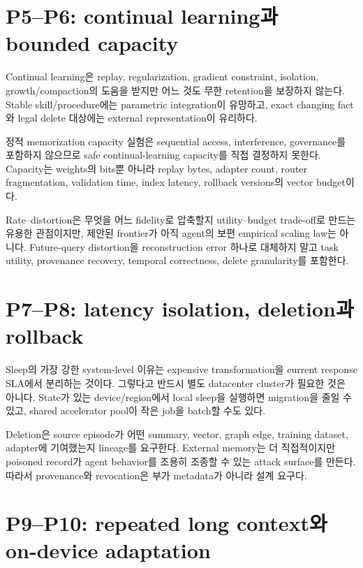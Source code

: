 \section{P5–P6: continual learning과 bounded capacity}

Continual learning은 replay, regularization, gradient constraint, isolation, growth/compaction의 도움을
받지만 어느 것도 무한 retention을 보장하지 않는다. Stable skill/procedure에는 parametric integration이
유망하고, exact changing fact와 legal delete 대상에는 external representation이 유리하다.

정적 memorization capacity 실험은 sequential access, interference, governance를 포함하지 않으므로
safe continual-learning capacity를 직접 결정하지 못한다. \parencite{srcstc0034,srcstc0036}
Capacity는 weights의 bits뿐 아니라 replay bytes, adapter count, router fragmentation, validation time,
index latency, rollback versions의 vector budget이다.

Rate--distortion은 무엇을 어느 fidelity로 압축할지 utility--budget trade-off로 만드는 유용한 관점이지만,
제안된 frontier가 아직 agent의 보편 empirical scaling law는 아니다.
\parencite{srcstc0035} Future-query distortion을 reconstruction error 하나로 대체하지 말고 task utility,
provenance recovery, temporal correctness, delete granularity를 포함한다.

\section{P7–P8: latency isolation, deletion과 rollback}

Sleep의 가장 강한 system-level 이유는 expensive transformation을 current response SLA에서 분리하는
것이다. 그렇다고 반드시 별도 datacenter cluster가 필요한 것은 아니다. State가 있는 device/region에서
local sleep을 실행하면 migration을 줄일 수 있고, shared accelerator pool이 작은 job을 batch할 수도 있다.

Deletion은 source episode가 어떤 summary, vector, graph edge, training dataset, adapter에 기여했는지
lineage를 요구한다. External memory는 더 직접적이지만 poisoned record가 agent behavior를 조용히
조종할 수 있는 attack surface를 만든다. 따라서 provenance와 revocation은 부가 metadata가 아니라
설계 요구다. \parencite{srcstc0042}

\section{P9–P10: repeated long context와 on-device adaptation}

